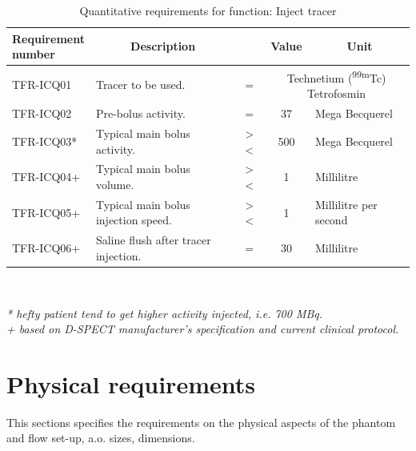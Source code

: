 \begin{table}[H]
\caption{Quantitative requirements for function: Inject tracer}
\label{tab:injtrac_quan}
\begin{tabular}{l|p{65mm}ccp{20mm}|}
	\makecell[l]{\textbf{Requirement} \\  \textbf{number}} & \multicolumn{1}{c}{\textbf{Description}} & \multicolumn{1}{c}{ } & \multicolumn{1}{c}{\textbf{Value}} & \multicolumn{1}{c}{\textbf{Unit}} \\
	\hline
	TFR-ICQ01 	& Tracer to be used. 					& = 			& \multicolumn{2}{p{35mm}|}{Technetium (\textsuperscript{99m}Tc) Tetrofosmin} \\
	TFR-ICQ02 	& Pre-bolus activity.					& = 			& 37				& Mega Becquerel \\
	TFR-ICQ03*	& Typical main bolus activity.		 	& > \spacing < 	& 500 \spacing 700 	& Mega Becquerel \\
	TFR-ICQ04+	& Typical main bolus volume. 			& > \spacing <	& 1 \spacing 2 		& Millilitre \\
	TFR-ICQ05+	& Typical main bolus injection speed.	& > \spacing < 	& 1 \spacing 2		& Millilitre per second \\
	TFR-ICQ06+	& Saline flush after tracer injection.	& =				& 30				& Millilitre \\
	\cline{2-5}
\end{tabular} \\
\raggedright
\textit{* hefty patient tend to get higher activity injected, i.e. 700 MBq.} \\
\textit{+ based on D-SPECT manufacturer's specification and current clinical protocol.}
\end{table}

\section{Physical requirements}
This sections specifies the requirements on the physical aspects of the phantom and flow set-up, a.o. sizes, dimensions.

